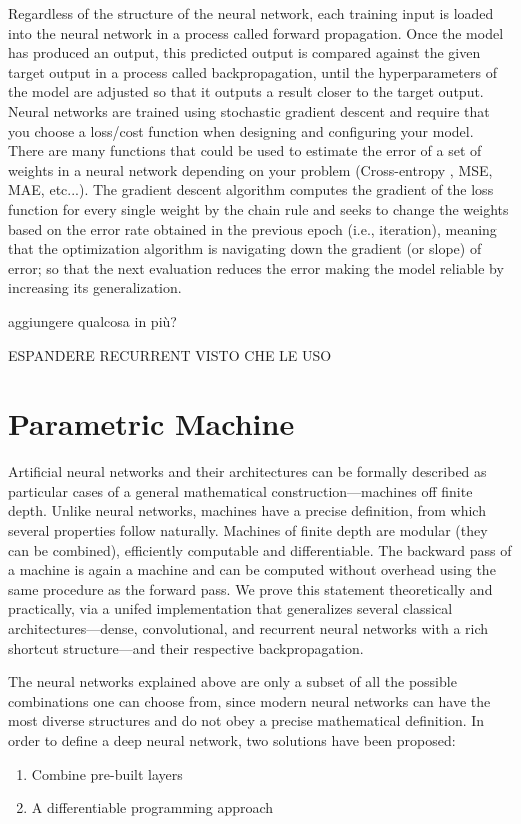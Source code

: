 \documentclass{article}
\begin{document}
Regardless of the structure of the neural network, each training input is loaded into the neural network in a process called forward propagation. Once the model has produced an output, this predicted output is compared against the given target output in a process called backpropagation, until the hyperparameters of the model are  adjusted so that it  outputs a result closer to the target output.
Neural networks are trained using stochastic gradient descent and require that you choose a loss/cost function when designing and configuring your model.
There are many functions that could be used to estimate the error of a set of weights in a neural network depending on your problem (Cross-entropy , MSE, MAE, etc...).
The gradient descent algorithm  computes the gradient of the loss function for every single weight by the chain rule and seeks to change the weights 
 based on the error rate obtained in the previous epoch (i.e., iteration), meaning that the optimization algorithm is navigating down the gradient (or slope) of error; so that the next evaluation reduces the error making the model reliable by increasing its generalization.

aggiungere qualcosa in più?



ESPANDERE RECURRENT VISTO CHE LE USO
\section{Parametric Machine}

Artificial neural networks and
their architectures can be formally described as particular cases of a general
mathematical construction—machines off finite depth. Unlike neural
networks, machines have a precise definition, from which several properties
follow naturally. Machines of finite depth are modular (they can be
combined), efficiently computable and differentiable. The backward pass
of a machine is again a machine and can be computed without overhead
using the same procedure as the forward pass. We prove this statement
theoretically and practically, via a unifed implementation that generalizes
several classical architectures—dense, convolutional, and recurrent neural
networks with a rich shortcut structure—and their respective backpropagation.



The neural networks explained above are only a subset of all the possible combinations one can choose from, since modern neural networks can have the most diverse structures and do not obey a precise mathematical definition.
In order to define a deep neural network, two solutions have been proposed:
\begin{enumerate}
\item   Combine pre-built layers
\item A differentiable programming approach
\end{enumerate}
\end{document}
